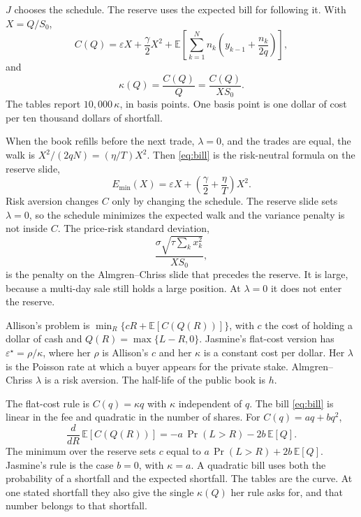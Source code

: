 \documentclass[11pt]{article}
\begin{document}
\(J\) chooses the schedule. The reserve uses the expected bill for following it. With \(X = Q/S_0\),
\begin{equation}
\label{eq:bill}
C(Q)
  = \varepsilon X + \frac{\gamma}{2} X^{2}
  + \mathbb{E}\!\left[\sum_{k=1}^{N} n_k\left(y_{k-1}+\frac{n_k}{2q}\right)\right],
\end{equation}
and
\begin{equation}
\label{eq:kappa}
\kappa(Q) = \frac{C(Q)}{Q} = \frac{C(Q)}{X S_0}.
\end{equation}
The tables report \(10{,}000\,\kappa\), in basis points. One basis point is one dollar of cost per ten thousand dollars of shortfall.

When the book refills before the next trade, \(\lambda = 0\), and the trades are equal, the walk is \(X^{2}/(2qN) = (\eta/T)X^{2}\). Then \eqref{eq:bill} is the risk-neutral formula on the reserve slide,
\[
  E_{\min}(X) = \varepsilon X + \left(\frac{\gamma}{2} + \frac{\eta}{T}\right) X^{2}.
\]
Risk aversion changes \(C\) only by changing the schedule. The reserve slide sets \(\lambda = 0\), so the schedule minimizes the expected walk and the variance penalty is not inside \(C\). The price-risk standard deviation,
\[
  \frac{\sigma\sqrt{\tau\sum_k x_k^{2}}}{X S_0},
\]
is the penalty on the Almgren--Chriss slide that precedes the reserve. It is large, because a multi-day sale still holds a large position. At \(\lambda = 0\) it does not enter the reserve.

Allison's problem is \(\min_R\{ c R + \mathbb{E}[C(Q(R))] \}\), with \(c\) the cost of holding a dollar of cash and \(Q(R) = \max\{L-R, 0\}\). Jasmine's flat-cost version has \(\varepsilon^{\star} = \rho/\kappa\), where her \(\rho\) is Allison's \(c\) and her \(\kappa\) is a constant cost per dollar. Her \(\lambda\) is the Poisson rate at which a buyer appears for the private stake. Almgren--Chriss \(\lambda\) is a risk aversion. The half-life of the public book is \(h\).

The flat-cost rule is \(C(q) = \kappa q\) with \(\kappa\) independent of \(q\). The bill \eqref{eq:bill} is linear in the fee and quadratic in the number of shares. For \(C(q) = aq + bq^{2}\),
\begin{equation}
\label{eq:foc}
\frac{d}{dR}\,\mathbb{E}[C(Q(R))]
  = -a\,\Pr(L > R) - 2b\,\mathbb{E}[Q].
\end{equation}
The minimum over the reserve sets \(c\) equal to \(a\,\Pr(L>R) + 2b\,\mathbb{E}[Q]\). Jasmine's rule is the case \(b = 0\), with \(\kappa = a\). A quadratic bill uses both the probability of a shortfall and the expected shortfall. The tables are the curve. At one stated shortfall they also give the single \(\kappa(Q)\) her rule asks for, and that number belongs to that shortfall.
\end{document}
